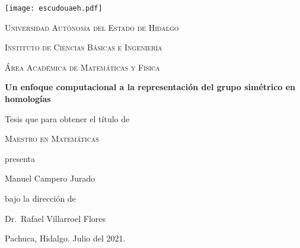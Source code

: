 \documentclass[12pt]{book}
\theoremstyle{definition}
\newcounter{in}
\newcommand{\elespacio}{1.4cm}
\begin{document}
\mainmatter 
\begin{titlepage}
  \begin{center}
    \null
    \vspace*{\fill}

    \texttt{[image: escudouaeh.pdf]}

    \vspace*{\elespacio}

    \textsc{Universidad Autónoma del Estado de Hidalgo}

    \textsc{Instituto de Ciencias Básicas e Ingeniería}

    \textsc{Área Académica de Matemáticas y Física}

    \vspace*{\elespacio}

    {\Huge\bfseries Un enfoque computacional a la representación del grupo simétrico en homologías\par}

    \vspace*{\elespacio}

    {\large Tesis que para obtener el título de}

    \vspace*{\elespacio}

    {\Large\textsc{Maestro en Matemáticas}}

    \vspace*{\elespacio}

    {\large presenta}

    \vspace*{\elespacio}

    {\Huge Manuel Campero Jurado}

    \vspace*{\elespacio}

    {\large bajo la dirección de}

    \bigskip

    {\Large Dr.~Rafael Villarroel Flores}

    \bigskip

    {Pachuca, Hidalgo. Julio del 2021.}

    \vspace*{\fill}

  \end{center}
\end{titlepage}

\thispagestyle{empty}

\tableofcontents

\newpage
\end{document}
